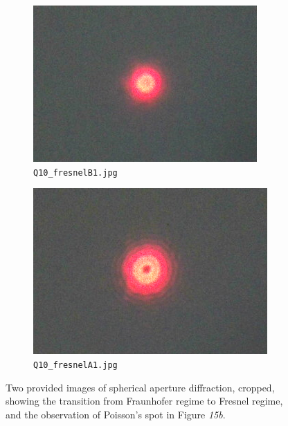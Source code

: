 \documentclass[a4paper]{article}
\begin{document}
\begin{figure}[h!]
\centering
\begin{subfigure}{.5\textwidth}
	\centering
	\centerline{\includegraphics[scale=2.33]{poissonB.png}}
	\caption{{\lstinline$Q10_fresnelB1.jpg$}}
\end{subfigure}%
\begin{subfigure}{.5\textwidth}
	\centering
	\centerline{\includegraphics[scale=2.22]{poissonA.png}}
	\caption{{\lstinline$Q10_fresnelA1.jpg$}}
\end{subfigure}
\label{fig:poisson}
\caption{Two provided images of spherical aperture diffraction, cropped, showing the transition from Fraunhofer regime to Fresnel regime, and the observation of Poisson's spot in Figure \emph{15b}.}
\end{figure}
\end{document}
